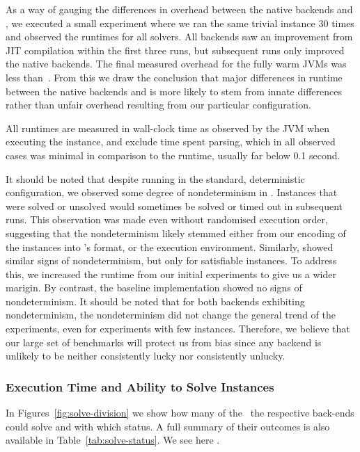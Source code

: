 \documentclass[acmsmall,review,anonymous,screen]{acmart}\settopmatter{printfolios=true,printccs=false,printacmref=true}
\theoremstyle{definition}
\begin{document}
As a way of gauging the differences in overhead between the native backends and \Nuxmv, we executed a small experiment where we ran the same trivial instance 30 times and observed the runtimes for all solvers. All backends saw an improvement from JIT compilation within the first three runs, but subsequent runs only improved the native backends. The final measured overhead for the fully warm JVMs was less than~\OverheadSeconds. From this we draw the conclusion that major differences in runtime between the native backends and \Nuxmv{} is more likely to stem from innate differences rather than unfair overhead resulting from our particular configuration.

All runtimes are measured in wall-clock time as observed by the JVM when executing the instance, and exclude time spent parsing, which in all observed cases was minimal in comparison to the runtime, usually far below 0.1 second.

It should be noted that despite running in the standard, deterministic configuration, we observed some degree of nondeterminism in \Nuxmv. Instances that were solved or unsolved would sometimes be solved or timed out in subsequent runs. This observation was made even without randomised execution order, suggesting that the nondeterminism likely stemmed either from our encoding of the instances into \Nuxmv's format, or the execution environment. Similarly, \Calculus{} showed similar signs of nondeterminism, but only for satisfiable instances. To address this, we increased the runtime from our initial experiments to give us a wider marigin. By contrast, the baseline implementation showed no signs of nondeterminism. It should be noted that for both backends exhibiting nondeterminism, the nondeterminism did not change the general trend of the experiments, even for experiments with few instances. Therefore, we believe that our large set of benchmarks will protect us from bias since any backend is unlikely to be neither consistently lucky nor consistently unlucky.

\subsubsection{Execution Time and Ability to Solve Instances}\label{sec:runtime}

In Figures~\ref{fig:solve-division} we show how many of the~\NrBenchmarks{} the respective back-ends could solve and with which status. A full summary of their outcomes is also available in Table~\ref{tab:solve-status}. We see here .
\end{document}
